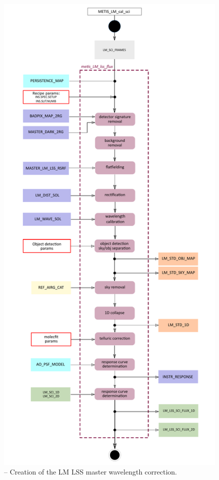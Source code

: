 \begin{figure}[ht]
  \centering
  \includegraphics[width=0.5\textheight]{figures/metis_lm_lss_flux_v0.62.pdf}
  \caption[Recipe: ]{ --
    Creation of the LM LSS master wavelength correction.}
  \label{Fig:rec_lm_lss_wave}
\end{figure}
\clearpage
